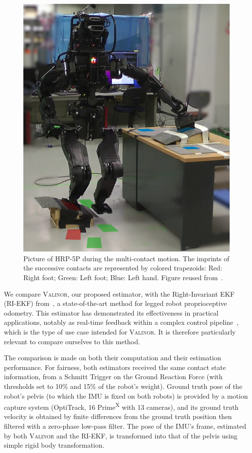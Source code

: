 \documentclass{IJCAS}
\begin{document}
\begin{figure}[!h]
\begin{center}
\includegraphics[width=0.6\columnwidth]{Uploaded/Images/multiContactExpe.png} 
\vskip -0.5pc
\caption{Picture of HRP-5P during the multi-contact motion. The imprints of the successive contacts are represented by colored trapezoids: Red: Right foot; Green: Left foot; Blue: Left hand. Figure reused from~\cite{Demont2024KineticsObserver}.}\label{fig:hrp5_multicontact}
\end{center}
\vskip -1.5pc
\end{figure}

\noindent We compare {\scshape Valinor}, our proposed estimator, with the Right-Invariant EKF (RI-EKF) from~\cite{Hartley2020RIEKF}, a state-of-the-art method for legged robot proprioceptive odometry. This estimator has demonstrated its effectiveness in practical applications, notably as real-time feedback within a complex control pipeline~\cite{Grandia2024DesignControlBipedalRoboticCharacter}, which is the type of use case intended for {\scshape Valinor}. It is therefore particularly relevant to compare ourselves to this method.

The comparison is made on both their computation and their estimation performance. For fairness, both estimators received the same contact state information, from a Schmitt Trigger on the Ground Reaction Force (with thresholds set to 10\% and 15\% of the robot's weight).
Ground truth pose of the robot's pelvis (to which the IMU is fixed on both robots) is provided by a motion capture system (OptiTrack, 16 Prime\textsuperscript{X} with 13 cameras), and its ground truth velocity is obtained by finite differences from the ground truth position then filtered with a zero-phase low-pass filter. The pose of the IMU's frame, estimated by both {\scshape Valinor} and the RI-EKF, is transformed into that of the pelvis using simple rigid body transformation.
\end{document}
